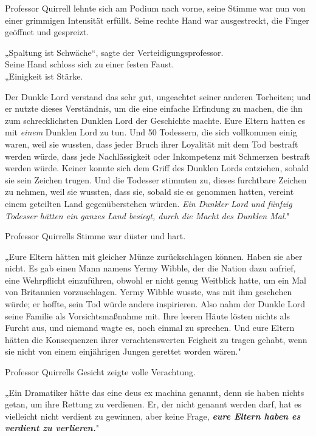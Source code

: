 {Professor Quirrell lehnte sich am Podium nach vorne, seine Stimme war nun von einer grimmigen Intensität erfüllt. Seine rechte Hand war ausgestreckt, die Finger geöffnet und gespreizt.

„Spaltung ist Schwäche“, sagte der Verteidigungsprofessor.\\ Seine Hand schloss sich zu einer festen Faust.\\ „Einigkeit ist Stärke.

Der Dunkle Lord verstand das sehr gut, ungeachtet seiner anderen Torheiten; und er nutzte dieses Verständnis, um die eine einfache Erfindung zu machen, die ihn zum schrecklichsten Dunklen Lord der Geschichte machte. Eure Eltern hatten es mit \emph{einem} Dunklen Lord zu tun. Und 50 Todessern, die sich vollkommen einig waren, weil sie wussten, dass jeder Bruch ihrer Loyalität mit dem Tod bestraft werden würde, dass jede Nachlässigkeit oder Inkompetenz mit Schmerzen bestraft werden würde. Keiner konnte sich dem Griff des Dunklen Lords entziehen, sobald sie sein Zeichen trugen. Und die Todesser stimmten zu, dieses furchtbare Zeichen zu nehmen, weil sie wussten, dass sie, sobald sie es genommen hatten, vereint einem geteilten Land gegenüberstehen würden. \emph{Ein Dunkler Lord und fünfzig Todesser hätten ein ganzes Land besiegt, durch die Macht des Dunklen Mal}."

Professor Quirrells Stimme war düster und hart.

„Eure Eltern hätten mit gleicher Münze zurückschlagen können. Haben sie aber nicht. Es gab einen Mann namens Yermy Wibble, der die Nation dazu aufrief, eine Wehrpflicht einzuführen, obwohl er nicht genug Weitblick hatte, um ein Mal von Britannien vorzuschlagen. Yermy Wibble wusste, was mit ihm geschehen würde; er hoffte, sein Tod würde andere inspirieren. Also nahm der Dunkle Lord seine Familie als Vorsichtsmaßnahme mit. Ihre leeren Häute lösten nichts als Furcht aus, und niemand wagte es, noch einmal zu sprechen. Und eure Eltern hätten die Konsequenzen ihrer verachtenswerten Feigheit zu tragen gehabt, wenn sie nicht von einem einjährigen Jungen gerettet worden wären."

Professor Quirrells Gesicht zeigte volle Verachtung.

„Ein Dramatiker hätte das eine deus ex machina genannt, denn sie haben nichts getan, um ihre Rettung zu verdienen. Er, der nicht genannt werden darf, hat es vielleicht nicht verdient zu gewinnen, aber keine Frage, \textbf{\emph{eure Eltern haben es verdient zu verlieren.}}"

}
